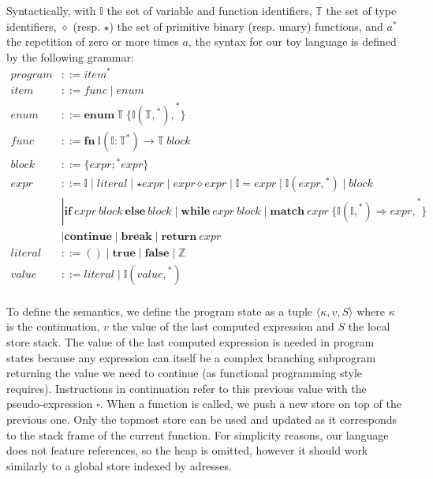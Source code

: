 \documentclass[a4paper,11pt]{article}
\newcommand\typsep{\mathrel{|}}
\newcommand\rtstate[3]{\langle #1, #2, #3\rangle}
\newcommand\yrg[1]{}%
\newcommand\gb[1]{}%
\begin{document}
\newcommand{\ident}{\mathbb{I}}
\newcommand{\typ}{\mathbb{T}}

Syntactically, with $\ident$ the set of variable and function
identifiers, $\typ$ the set of type identifiers, $\diamond$
(resp. $\star$) the set of primitive binary (resp. unary) functions, and $\boxed{a}^*$ the repetition of zero or more times $a$,
the syntax for our toy language is defined by the following grammar:
\begin{align*}
program &::= \boxed{item}^*\\
item &::= func \typsep enum\\
enum &::= \mathbf{enum}\ \typ\ \{ \boxed{\ident(\boxed{\typ,}^*),}^* \}\\
func &::= \mathbf{fn}\ \ident(\boxed{\ident: \typ}^*) \rightarrow \typ\ block\\
block &::= \{ \boxed{expr;}^* expr \}\\
expr &::= \ident \typsep literal \typsep \star expr \typsep expr \diamond expr \typsep \ident = expr \typsep \ident(\boxed{expr,}^*) \typsep block\\
&\typsep \mathbf{if}\ expr\ block\ \mathbf{else}\ block \typsep \mathbf{while}\ expr\ block \typsep \mathbf{match}\ expr\ \{ \boxed{\ident(\boxed{\ident,}^*) \Rightarrow expr,}^* \}\\
&\typsep \mathbf{continue} \typsep \mathbf{break} \typsep \textbf{return}\ expr\\
literal &::= () \typsep \mathbf{true} \typsep \mathbf {false} \typsep \mathbb{Z}\\
value &::= literal \typsep \ident(\boxed{value,}^*)\\
\end{align*}

\yrg{What do the boxes mean? Is that a standard format? If so, could
  you give a reference for its specification?} \gb{It comes from the documentation of Coq apparently. I added its introduction above the definition.}

\yrg{What is the meaning of $\star expr$?} \gb{It is written above... Don't know how to improve.}

To define the semantics, we define the program state as a tuple
$\rtstate{\kappa}{v}{S}$ where $\kappa$ is the continuation, $v$ the
value of the last computed expression and $S$ the local store
stack.
The value of the last computed expression is needed in program states because any expression can itself be a complex branching subprogram returning the value we need to continue (as functional programming style requires). Instructions in continuation refer to this previous value with the pseudo-expression $\square$.
When a function is called, we push a new store on top of the previous
one. Only the topmost store can be used and updated as it
corresponds to the stack frame of the current function.
For simplicity reasons, our language does not feature references, so the heap is omitted, however it should work similarly to a global store indexed by adresses.
\end{document}

